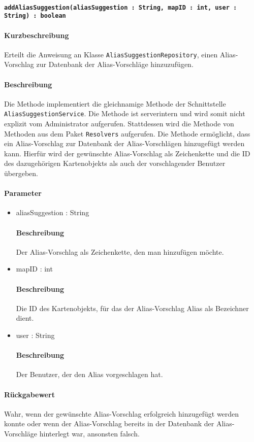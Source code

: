 \paragraph{\texttt{addAliasSuggestion(aliasSuggestion : String, mapID : int, user : String) : boolean}}%
\paragraph*{Kurzbeschreibung}
Erteilt die Anweisung an Klasse \texttt{AliasSuggestionRepository}, einen Alias-Vorschlag zur Datenbank der Alias-Vorschläge hinzuzufügen.
\paragraph*{Beschreibung}
Die Methode implementiert die gleichnamige Methode der Schnittstelle \texttt{AliasSuggestionService}.
Die Methode ist serverintern und wird somit nicht explizit vom Administrator aufgerufen.
Stattdessen wird die Methode von Methoden aus dem Paket \texttt{Resolvers} aufgerufen.
Die Methode ermöglicht, dass ein Alias-Vorschlag zur Datenbank der Alias-Vorschlägen hinzugefügt werden kann.
Hierfür wird der gewünschte Alias-Vorschlag als Zeichenkette und die ID des dazugehörigen Kartenobjekts als auch der vorschlagender Benutzer übergeben.
\paragraph*{Parameter}
\begin{itemize}
    \item aliasSuggestion : String
    		\paragraph*{Beschreibung}
    		Der Alias-Vorschlag als Zeichenkette, den man hinzufügen möchte.
    \item mapID : int
    		\paragraph*{Beschreibung}
    		Die ID des Kartenobjekts, für das der Alias-Vorschlag Alias als Bezeichner dient.
    	\item user : String
    		\paragraph*{Beschreibung}
    		Der Benutzer, der den Alias vorgeschlagen hat.
\end{itemize}
\paragraph*{Rückgabewert}
Wahr, wenn der gewünschte Alias-Vorschlag erfolgreich hinzugefügt werden konnte oder wenn der Alias-Vorschlag bereits in der Datenbank der Alias-Vorschläge hinterlegt war, ansonsten falsch.
